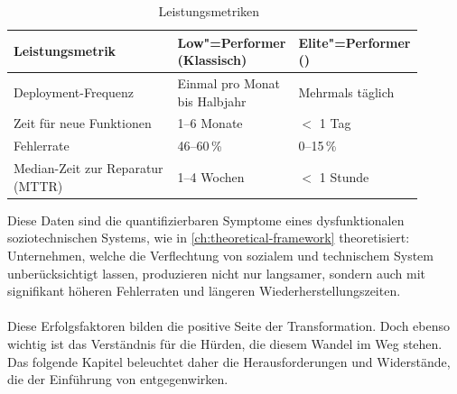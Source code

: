 \begin{table}[htbp]
	\centering
	\begin{tabular}{p{0.40\linewidth} p{0.25\linewidth} p{0.25\linewidth}}
		\hline
		Leistungsmetrik                  & Low"=Performer (Klassisch)    & Elite"=Performer (\DO) \\
		\hline
		Deployment-Frequenz              & Einmal pro Monat bis Halbjahr & Mehrmals täglich       \\
		Zeit für neue Funktionen         & 1--6 Monate                   & $<$ 1 Tag              \\
		Fehlerrate                       & 46--60\,\%                    & 0--15\,\%              \\
		Median-Zeit zur Reparatur (MTTR) & 1--4 Wochen                   & $<$ 1 Stunde           \\
		\hline
	\end{tabular}
	\caption{Leistungsmetriken~\cite[6]{dor20}}
\end{table}

Diese Daten sind die quantifizierbaren Symptome eines dysfunktionalen soziotechnischen Systems, wie in \autoref{ch:theoretical-framework} theoretisiert: Unternehmen, welche die Verflechtung von sozialem und technischem System unberücksichtigt lassen, produzieren nicht nur langsamer, sondern auch mit signifikant höheren Fehlerraten und längeren Wiederherstellungszeiten.

\paragraph{}
Diese Erfolgsfaktoren bilden die positive Seite der Transformation.
Doch ebenso wichtig ist das Verständnis für die Hürden, die diesem Wandel im Weg stehen.
Das folgende Kapitel beleuchtet daher die Herausforderungen und Widerstände, die der Einführung von \DO entgegenwirken.